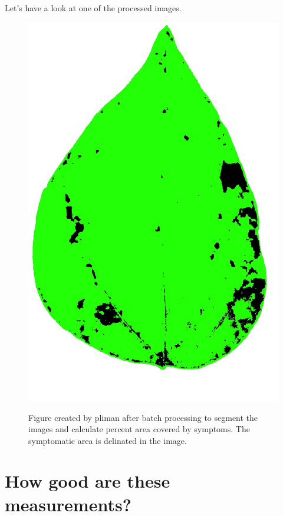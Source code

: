 \documentclass[
  letterpaper,
  DIV=11,
  numbers=noendperiod]{scrreprt}
\begin{document}
Let's have a look at one of the processed images.

\begin{figure}

{\centering 

\href{fig_proc1}{\includegraphics[width=4.70833in,height=\textheight]{imgs/processed/proc_img46.jpg}}

}

\caption{\label{fig-processed}Figure created by pliman after batch
processing to segment the images and calculate percent area covered by
symptoms. The symptomatic area is delinated in the image.}

\end{figure}

\hypertarget{how-good-are-these-measurements}{%
\section{How good are these
measurements?}\label{how-good-are-these-measurements}}
\end{document}
